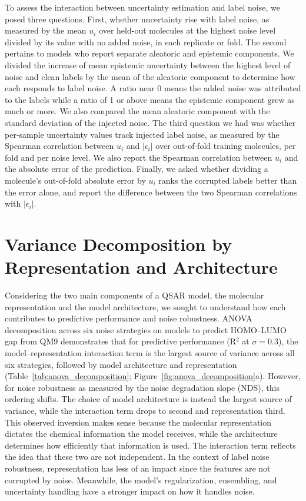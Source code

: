To assess the interaction between uncertainty estimation and label noise, we posed three questions. First, whether uncertainty rise with label noise, as measured by the mean $u_i$ over held-out molecules at the highest noise level
divided by its value with no added noise, in each replicate or fold. The second pertains to models who report separate aleatoric and epistemic components. We divided the increase of mean epistemic uncertainty between the highest level of noise and clean labels by the mean of the aleatoric component to determine how each responds to label noise. A ratio near 0 means the added noise was attributed to the labels while a ratio of 1 or above means the epistemic component grew as much or more. We also compared the mean aleatoric component with the standard deviation of the injected noise. The third question we had was whether per-sample uncertainty values track injected label noise, as measured by the Spearman correlation between $u_i$ and $|\epsilon_i|$ over out-of-fold training molecules, per fold and per noise level. We also report the Spearman correlation between $u_i$ and the absolute error of the prediction. Finally, we asked whether dividing a molecule's out-of-fold absolute error by $u_i$ ranks the corrupted labels better than the error alone, and report the difference between the two Spearman correlations with $|\epsilon_i|$.


\section{Variance Decomposition by Representation and Architecture}


Considering the two main components of a QSAR model, the molecular representation and the model architecture, we sought to understand how each contributes to predictive performance and noise robustness. ANOVA decomposition across six noise strategies on models to predict HOMO--LUMO gap from QM9 demonstrates that for predictive performance (R$^2$ at $\sigma = 0.3$), the model--representation interaction term is the  largest source of variance across all six strategies, followed by model architecture and representation (Table~\ref{tab:anova_decomposition}; Figure~\ref{fig:anova_decomposition}a). However, for noise robustness as measured by the noise degradation slope (NDS), this ordering shifts. The choice of model architecture is instead the largest source of variance, while the interaction term drops to second and representation third. This observed inversion makes sense because the molecular representation dictates the chemical information the model receives, while the architecture determines how efficiently that information is used. The interaction term reflects the idea that these two are not independent. In the context of label noise robustness, representation has less of an impact since the features are not corrupted by noise. Meanwhile, the model's regularization, ensembling, and uncertainty handling have a stronger impact on how it handles noise. 


